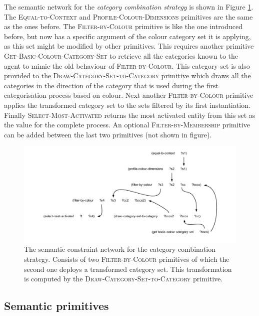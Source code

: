The semantic network for the \emph{category combination strategy} is
shown in Figure \ref{f:ccs-semantic-program}. The
\textsc{Equal-to-Context} and \textsc{Profile-Colour-Dimensions}
primitives are the same as the ones before. The
\textsc{Filter-by-Colour} primitive is like the one introduced before,
but now has a specific argument of the colour category set it is
applying, as this set might be modified by other primitives. This
requires another primitive \textsc{Get-Basic-Colour-Category-Set} to
retrieve all the categories known to the agent to mimic the old
behaviour of \textsc{Filter-by-Colour}. This category set is also
provided to the \textsc{Draw-Category-Set-to-Category} primitive which
draws all the categories in the direction of the category that is used
during the first categorisation process based on colour. Next another
\textsc{Filter-by-Colour} primitive applies the transformed category
set to the sets filtered by its first instantiation. Finally
\textsc{Select-Most-Activated} returns the most activated entity from
this set as the value for the complete process.  An optional
\textsc{Filter-by-Membership} primitive can be added between the last
two primitives (not shown in figure).

\begin{figure}[htbp]
  \centering
  \includegraphics[width=\textwidth]{./category-combination/figures/semantic-program.pdf}
  \caption[The semantic constraint network for the category combination
  strategy]{The semantic constraint network for the category combination
      strategy. Consists of two \textsc{Filter-by-Colour} primitives
    of which the second one deploys a transformed category set. This
    transformation is computed by the
    \textsc{Draw-Category-Set-to-Category} primitive.}
  \label{f:ccs-semantic-program}
\end{figure}

\subsection{Semantic primitives}

